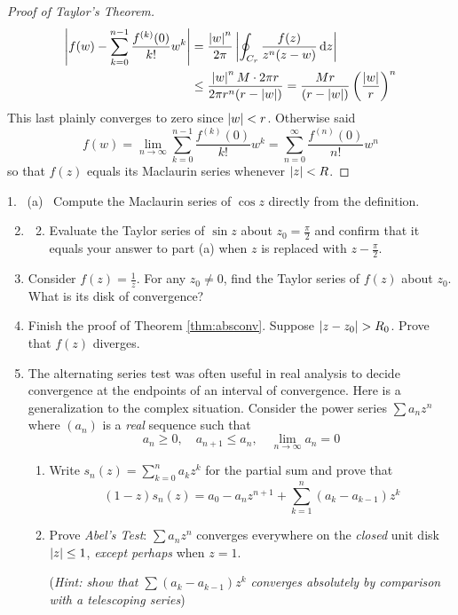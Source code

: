 \begin{proof}[Proof of Taylor's Theorem]
\begin{align*}
\nm{f(w)-\sum_{k=0}^{n-1} \frac{f^{(k)}(0)}{k!}w^k} &= \frac{\nm w^n}{2\pi}\nm{\oint_{C_r}\frac{f(z)}{z^n(z-w)}\,\dz}\\
&\le\frac{\nm w^nM\cdot 2\pi r}{2\pi r^n(r-\nm w)} =\frac{Mr}{(r-\nm w)}\left(\frac{\nm w}r\right)^n %
\end{align*}
This last plainly converges to zero since $\left| w\right|<r$. Otherwise said
\[f(w)=\lim_{n\to\infty}\sum_{k=0}^{n-1} \frac{f^{(k)}(0)}{k!}w^k =\sum_{n=0}^{\infty} \frac{f^{(n)}(0)}{n!}w^n\]
so that $f(z)$ equals its Maclaurin series whenever $\left| z\right|<R$.
\end{proof}
\clearpage


\begin{exercises*}
\hangindent\doubleind
\textup{1.} \ (a) \ Compute the Maclaurin series of $\cos z$ directly from the definition.
\begin{enumerate}\setcounter{enumi}{1}
  \item[]\begin{enumerate}\setcounter{enumii}{1}
    \item Evaluate the Taylor series of $\sin z$ about $z_0=\frac\pi 2$ and confirm that it equals your answer to part (a) when $z$ is replaced with $z-\frac\pi 2$.
  \end{enumerate} 
  
  \item Consider $f(z)=\frac 1z$. For any $z_0\neq 0$, find the Taylor series of $f(z)$ about $z_0$. What is its disk of convergence?
    
  \item Finish the proof of Theorem \ref{thm:absconv}. Suppose $\nm{z-z_0}>R_0$. Prove that $f(z)$ diverges.
  
  
  \item\label{exs:abeltest} The alternating series test was often useful in real analysis to decide convergence at the endpoints of an interval of convergence. Here is a generalization to the complex situation.\smallbreak
   Consider the power series $\sum a_nz^n$ where $(a_n)$ is a \emph{real} sequence such that
    \[a_n\ge 0,\quad a_{n+1}\le a_n,\quad \lim_{n\to\infty}a_n=0\]
  \begin{enumerate}
    \item Write $s_n(z)=\sum\limits_{k=0}^na_kz^k$ for the partial sum and prove that
    \[(1-z)s_n(z)=a_0-a_nz^{n+1}+\sum_{k=1}^n(a_k-a_{k-1})z^k\]
    
    \item Prove \emph{Abel's Test}: $\sum a_nz^n$ converges everywhere on the \emph{closed} unit disk $\left| z\right|\le 1$, \emph{except perhaps} when $z=1$.\par
    (\emph{Hint: show that $\sum(a_k-a_{k-1})z^k$ converges absolutely by comparison with a telescoping series})
    

\end{enumerate}
\end{enumerate}
\end{exercises*}
